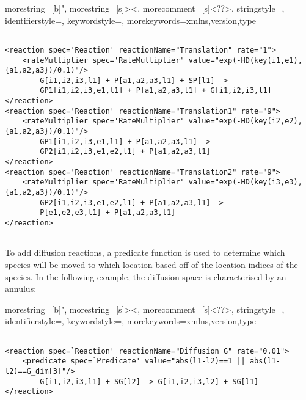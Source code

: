 \documentclass{article}
\begin{document}

{
  morestring=[b]",
  morestring=[s]{>}{<},
  morecomment=[s]{<?}{?>},
  stringstyle=\color{black},
  identifierstyle=\color{darkblue},
  keywordstyle=\color{cyan},
  morekeywords={xmlns,version,type}%
}

\footnotesize{
\begin{lstlisting}

<reaction spec='Reaction' reactionName="Translation" rate="1">
    <rateMultiplier spec='RateMultiplier' value="exp(-HD(key(i1,e1),{a1,a2,a3})/0.1)"/>
        G[i1,i2,i3,l1] + P[a1,a2,a3,l1] + SP[l1] -> 
        GP1[i1,i2,i3,e1,l1] + P[a1,a2,a3,l1] + G[i1,i2,i3,l1] 
</reaction>          
<reaction spec='Reaction' reactionName="Translation1" rate="9">
    <rateMultiplier spec='RateMultiplier' value="exp(-HD(key(i2,e2),{a1,a2,a3})/0.1)"/>
        GP1[i1,i2,i3,e1,l1] + P[a1,a2,a3,l1] -> 
        GP2[i1,i2,i3,e1,e2,l1] + P[a1,a2,a3,l1]
</reaction>
<reaction spec='Reaction' reactionName="Translation2" rate="9">
    <rateMultiplier spec='RateMultiplier' value="exp(-HD(key(i3,e3),{a1,a2,a3})/0.1)"/>
        GP2[i1,i2,i3,e1,e2,l1] + P[a1,a2,a3,l1] -> 
        P[e1,e2,e3,l1] + P[a1,a2,a3,l1]
</reaction>        
        
\end{lstlisting}}

\normalsize{To add diffusion reactions, a predicate function is used to determine which species will be moved to which location based off of the location indices of the species.  
In the following example, the diffusion space is characterised by an annulus:}


{
  morestring=[b]",
  morestring=[s]{>}{<},
  morecomment=[s]{<?}{?>},
  stringstyle=\color{black},
  identifierstyle=\color{darkblue},
  keywordstyle=\color{cyan},
  morekeywords={xmlns,version,type}%
}

\footnotesize{
\begin{lstlisting}

<reaction spec=`Reaction' reactionName="Diffusion_G" rate="0.01">
    <predicate spec=`Predicate' value="abs(l1-l2)==1 || abs(l1-l2)==G_dim[3]"/>
        G[i1,i2,i3,l1] + SG[l2] -> G[i1,i2,i3,l2] + SG[l1]
</reaction>          
        
\end{lstlisting}}
\end{document}
